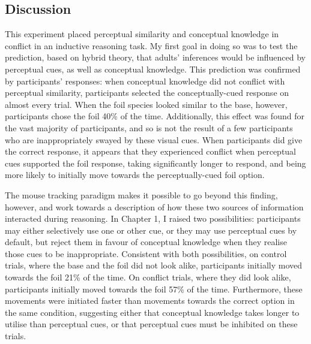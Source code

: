 
\subsection{Discussion}

This experiment placed perceptual similarity
and conceptual knowledge in conflict
in an inductive reasoning task.
My first goal in doing so was to test the prediction,
based on  hybrid theory,
that adults' inferences would be influenced by perceptual cues,
as well as conceptual knowledge.
This prediction was confirmed by participants' responses:
when conceptual knowledge did not conflict with perceptual similarity,
participants selected the conceptually-cued response on almost every trial.
When the foil species looked similar to the base, however,
participants chose the foil 40\% of the time.
Additionally, this effect was found for the vast majority of participants,
and so is not the result of a few participants who are
inappropriately swayed by these visual cues.
When participants did give the correct response,
it appears that they experienced conflict
when perceptual cues supported the foil response,
taking significantly longer to respond,
and being more likely to initially move towards
the perceptually-cued foil option.

The mouse tracking paradigm makes it possible
to go beyond this finding, however,
and work towards a description of
how these two sources of information interacted during reasoning.
In Chapter 1, I raised two possibilities:
participants may either selectively use one or other cue,
or they may use perceptual cues by default,
but reject them in favour of conceptual knowledge
when they realise those cues to be inappropriate.
Consistent with both possibilities,
on control trials, where the base and the foil did not look alike,
participants initially moved towards the foil 21\% of the time.
On conflict trials, where they did look alike,
participants initially moved towards the foil 57\% of the time.
Furthermore, these movements %
were initiated faster than movements towards the correct option in the same condition,
suggesting either
that conceptual knowledge takes longer to utilise than perceptual cues,
or that perceptual cues must be inhibited on these trials.

